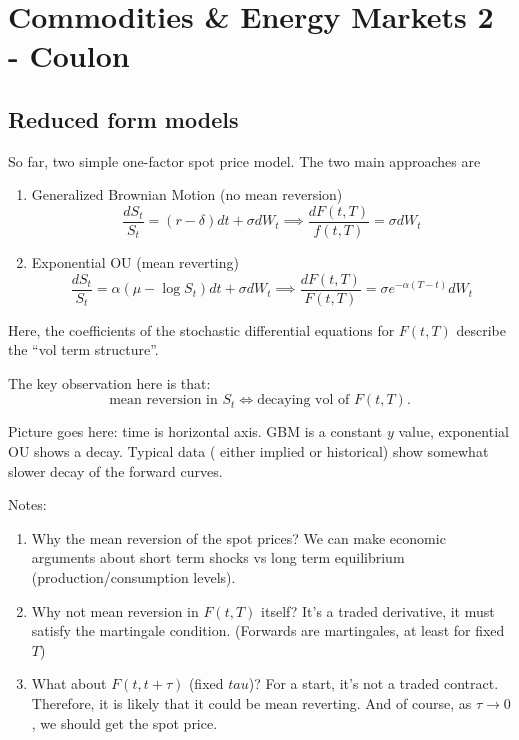 \chapter{Commodities \& Energy Markets 2 - Coulon}
\section{Reduced form models}
So far, two simple one-factor spot price model. The two main approaches are
\begin{enumerate}
	\item Generalized Brownian Motion (no mean reversion)
	\begin{equation}
		\frac{dS_t}{S_t} = (r-\delta)dt + \sigma dW_t \implies \frac{dF(t,T)}{f(t,T)} = \sigma dW_t
	\end{equation}
	
	\item Exponential OU (mean reverting)
	\begin{equation}
		\frac{dS_t}{S_t} = \alpha (\mu - \log S_t) dt + \sigma dW_t \implies \frac{dF(t,T)}{F(t,T)} = \sigma e^{-\alpha(T-t)}dW_t
	\end{equation}
\end{enumerate}

Here, the coefficients of the stochastic differential equations for $F(t,T)$ describe the ``vol term structure''.

The key observation here is that:
\begin{equation}
	\text{mean reversion in } S_t \iff \text{decaying vol of } F(t,T).
\end{equation}

Picture goes here: time is horizontal axis. GBM is a constant $y$ value, exponential OU shows a decay. Typical data ( either implied or historical) show somewhat slower decay of the forward curves.

Notes:
\begin{enumerate}
	\item Why the mean reversion of the spot prices? We can make economic arguments about short term shocks vs long term equilibrium (production/consumption levels).
	
	\item Why not mean reversion in $F(t,T)$ itself? It's a traded derivative, it must satisfy the martingale condition. (Forwards are martingales, at least for fixed $T$) 
	
	\item What about $F(t,t+\tau)$ (fixed $tau$)? For a start, it's not a traded contract. Therefore, it is likely that it could be mean reverting. And of course, as $\tau \to 0$, we should get the spot price.
	
\end{enumerate}

